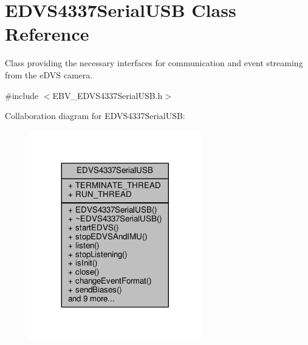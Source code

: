 \hypertarget{class_e_d_v_s4337_serial_u_s_b}{}\section{E\+D\+V\+S4337\+Serial\+U\+S\+B Class Reference}
\label{class_e_d_v_s4337_serial_u_s_b}


Class providing the necessary interfaces for communication and event streaming from the e\+D\+V\+S camera.  




{\ttfamily \#include $<$E\+B\+V\+\_\+\+E\+D\+V\+S4337\+Serial\+U\+S\+B.\+h$>$}



Collaboration diagram for E\+D\+V\+S4337\+Serial\+U\+S\+B\+:
\nopagebreak
\begin{figure}[H]
\begin{center}
\leavevmode
\includegraphics[width=212pt]{class_e_d_v_s4337_serial_u_s_b__coll__graph}
\end{center}
\end{figure}
